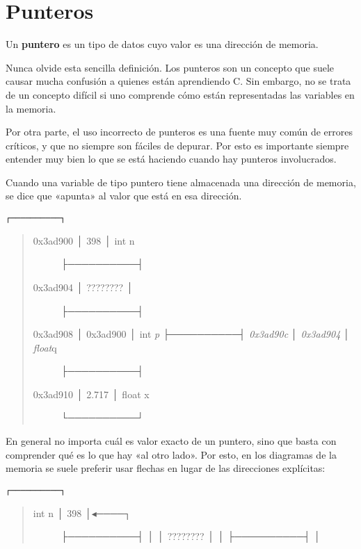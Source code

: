 \section{Punteros}

Un \textbf{puntero} es un tipo de datos cuyo valor es una dirección de
memoria.

Nunca olvide esta sencilla definición. Los punteros son un concepto que
suele causar mucha confusión a quienes están aprendiendo C. Sin embargo,
no se trata de un concepto difícil si uno comprende cómo están
representadas las variables en la memoria.

Por otra parte, el uso incorrecto de punteros es una fuente muy común de
errores críticos, y que no siempre son fáciles de depurar. Por esto es
importante siempre entender muy bien lo que se está haciendo cuando hay
punteros involucrados.

Cuando una variable de tipo puntero tiene almacenada una dirección de
memoria, se dice que «apunta» al valor que está en esa dirección.

\begin{lstlisting}
┌──────────┐
\end{lstlisting}

\begin{quote}
\begin{description}
\item[0x3ad900 │ 398 │ int n]
├──────────┤
\item[0x3ad904 │ ???????? │]
├──────────┤
\item[0x3ad908 │ 0x3ad900 │ int \emph{p ├──────────┤ 0x3ad90c │ 0x3ad904
│ float}q]
├──────────┤
\item[0x3ad910 │ 2.717 │ float x]
└──────────┘
\end{description}
\end{quote}

En general no importa cuál es valor exacto de un puntero, sino que basta
con comprender qué es lo que hay «al otro lado». Por esto, en los
diagramas de la memoria se suele preferir usar flechas en lugar de las
direcciones explícitas:

\begin{lstlisting}
┌──────────┐
\end{lstlisting}

\begin{quote}
\begin{description}
\item[int n │ 398 │◂────┐]
├──────────┤ │ │ ???????? │ │ ├──────────┤ │
\end{description}
\end{quote}

